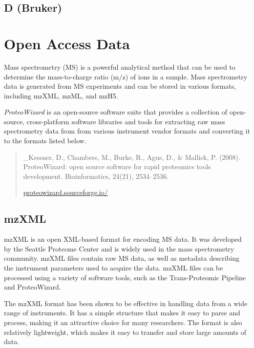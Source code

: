 \documentclass[
]{book}
\begin{document}
\hypertarget{d-bruker}{%
\subsection*{D (Bruker)}\label{d-bruker}}

\hypertarget{open-access-data}{%
\section{Open Access Data}\label{open-access-data}}

Mass spectrometry (MS) is a powerful analytical method that can be used to determine the mass-to-charge ratio (m/z) of ions in a sample. Mass spectrometry data is generated from MS experiments and can be stored in various formats, including mzXML, mzML, and mzH5.

\emph{ProteoWizard} is an open-source software suite that provides a collection of open-source, cross-platform software libraries and tools for extracting raw mass spectrometry data from from various instrument vendor formats and converting it to the formats listed below.

\begin{quote}
\_Kessner, D., Chambers, M., Burke, R., Agus, D., \& Mallick, P. (2008). ProteoWizard: open source software for rapid proteomics tools development. Bioinformatics, 24(21), 2534--2536.

\href{https://proteowizard.sourceforge.io/}{proteowizard.sourceforge.io/}
\end{quote}

\hypertarget{mzxml}{%
\subsection*{mzXML}\label{mzxml}}

mzXML is an open XML-based format for encoding MS data. It was developed by the Seattle Proteome Center and is widely used in the mass spectrometry community. mzXML files contain raw MS data, as well as metadata describing the instrument parameters used to acquire the data. mzXML files can be processed using a variety of software tools, such as the Trans-Proteomic Pipeline and ProteoWizard.

The mzXML format has been shown to be effective in handling data from a wide range of instruments. It has a simple structure that makes it easy to parse and process, making it an attractive choice for many researchers. The format is also relatively lightweight, which makes it easy to transfer and store large amounts of data.
\end{document}
